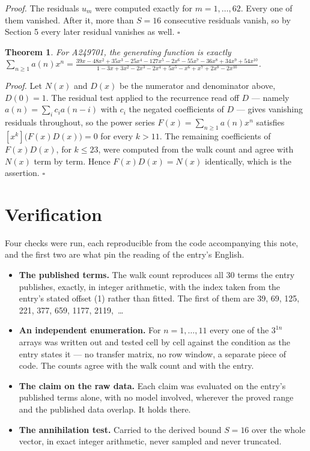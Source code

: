 \documentclass[11pt]{article}
\newtheorem{theorem}{Theorem}
\theoremstyle{definition}
\begin{document}
{\itshape Proof.} The residuals $u_m$ were computed exactly for $m = 1,\dots,62$. Every one of them vanished. After it, more than $S = 16$ consecutive residuals vanish, so by Section 5 every later residual vanishes as well. $\square$

\begin{theorem} For A249701, the generating function is exactly $\sum_{n\ge 1} a(n)x^n = \frac{39x - 48x^{2} + 35x^{3} - 25x^{4} - 127x^{5} - 2x^{6} - 55x^{7} - 36x^{8} + 34x^{9} + 54x^{10}}{1 - 3x + 3x^{2} - 2x^{3} - 2x^{4} + 5x^{5} - x^{6} + x^{7} + 2x^{8} - 2x^{10}}$.\end{theorem}

{\itshape Proof.} Let $N(x)$ and $D(x)$ be the numerator and denominator above, $D(0)=1$. The residual test applied to the recurrence read off $D$ --- namely $a(n) = \sum_i c_i a(n-i)$ with $c_i$ the negated coefficients of $D$ --- gives vanishing residuals throughout, so the power series $F(x)=\sum_{n\ge 1}a(n)x^n$ satisfies $[x^k]\bigl(F(x)D(x)\bigr) = 0$ for every $k > 11$. The remaining coefficients of $F(x)D(x)$, for $k \le 23$, were computed from the walk count and agree with $N(x)$ term by term. Hence $F(x)D(x) = N(x)$ identically, which is the assertion. $\square$

\section{Verification}

Four checks were run, each reproducible from the code accompanying this note, and the first two are what pin the reading of the entry's English.

\begin{itemize}

\item {\bfseries The published terms.} The walk count reproduces all 30 terms the entry publishes, exactly, in integer arithmetic, with the index taken from the entry's stated offset (1) rather than fitted. The first of them are 39, 69, 125, 221, 377, 659, 1177, 2119,~\dots

\item {\bfseries An independent enumeration.} For $n = 1,\dots,11$ every one of the $3^{1n}$ arrays was written out and tested cell by cell against the condition as the entry states it --- no transfer matrix, no row window, a separate piece of code. The counts agree with the walk count and with the entry.

\item {\bfseries The claim on the raw data.} Each claim was evaluated on the entry's published terms alone, with no model involved, wherever the proved range and the published data overlap. It holds there.

\item {\bfseries The annihilation test.} Carried to the derived bound $S = 16$ over the whole vector, in exact integer arithmetic, never sampled and never truncated.

\end{itemize}
\end{document}
